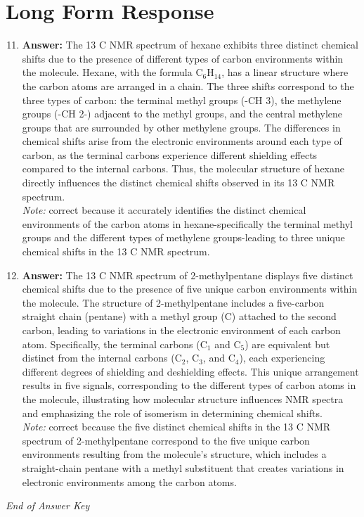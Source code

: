 \documentclass[12pt]{article}
\begin{document}
\section*{Long Form Response}
\begin{enumerate}[label=\arabic*.]
\setcounter{enumi}{10}
\item \textbf{Answer:} The 13 C NMR spectrum of hexane exhibits three distinct chemical shifts due to the presence of different types of carbon environments within the molecule. Hexane, with the formula C$_{6}$H$_{14}$, has a linear structure where the carbon atoms are arranged in a chain. The three shifts correspond to the three types of carbon: the terminal methyl groups (-CH 3), the methylene groups (-CH 2-) adjacent to the methyl groups, and the central methylene groups that are surrounded by other methylene groups. The differences in chemical shifts arise from the electronic environments around each type of carbon, as the terminal carbons experience different shielding effects compared to the internal carbons. Thus, the molecular structure of hexane directly influences the distinct chemical shifts observed in its 13 C NMR spectrum.
\\ \textit{Note:} correct because it accurately identifies the distinct chemical environments of the carbon atoms in hexane-specifically the terminal methyl groups and the different types of methylene groups-leading to three unique chemical shifts in the 13 C NMR spectrum.
\item \textbf{Answer:} The 13 C NMR spectrum of 2-methylpentane displays five distinct chemical shifts due to the presence of five unique carbon environments within the molecule. The structure of 2-methylpentane includes a five-carbon straight chain (pentane) with a methyl group (C) attached to the second carbon, leading to variations in the electronic environment of each carbon atom. Specifically, the terminal carbons (C$_{1}$ and C$_{5}$) are equivalent but distinct from the internal carbons (C$_{2}$, C$_{3}$, and C$_{4}$), each experiencing different degrees of shielding and deshielding effects. This unique arrangement results in five signals, corresponding to the different types of carbon atoms in the molecule, illustrating how molecular structure influences NMR spectra and emphasizing the role of isomerism in determining chemical shifts.
\\ \textit{Note:} correct because the five distinct chemical shifts in the 13 C NMR spectrum of 2-methylpentane correspond to the five unique carbon environments resulting from the molecule's structure, which includes a straight-chain pentane with a methyl substituent that creates variations in electronic environments among the carbon atoms.
\end{enumerate}

\vfill
\noindent\textit{End of Answer Key}
\end{document}
